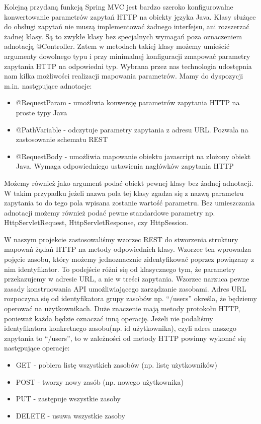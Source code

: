 Kolejną przydaną funkcją Spring MVC jest bardzo szeroko konfigurowalne konwertowanie parametrów zapytań HTTP na obiekty języka Java. Klasy służące do obsługi zapytań nie muszą implementować żadnego interfejsu, ani rozszerzać żadnej klasy. Są to zwykłe klasy bez specjalnych wymagań poza oznaczeniem adnotacją @Controller. Zatem w metodach takiej klasy możemy umieścić argumenty dowolnego typu i przy minimalnej konfiguracji zmapować parametry zapytania HTTP na odpowiedni typ. Wybrana przez nas technologia udostępnia nam kilka możliwości realizacji mapowania parametrów. Mamy do dyspozycji m.in. następujące adnotacje:

\begin{itemize}
\item @RequestParam - umożliwia konwersję parametrów zapytania HTTP na proste typy Java
\item @PathVariable - odczytuje parametry zapytania z adresu URL. Pozwala na zastosowanie schematu REST 
\item @RequestBody - umożliwia mapowanie obiektu javascript na złożony obiekt Java. Wymaga odpowiedniego ustawienia nagłówków zapytania HTTP
\end{itemize}

Możemy również jako argument podać obiekt pewnej klasy bez żadnej adnotacji. W takim przypadku jeżeli nazwa pola tej klasy zgadza się z nazwą parametru zapytania to do tego pola wpisana zostanie wartość parametru. Bez umieszczania adnotacji możemy również podać pewne standardowe parametry np. HttpServletRequest, HttpServletResponse, czy HttpSession.

W naszym projekcie zastosowaliśmy wzorzec REST do stworzenia struktury mapowań żądań HTTP na metody odpowiednich klasy. Wzorzec ten wprowadza pojęcie zasobu, który możemy jednoznacznie zidentyfikować poprzez powiązany z nim identyfikator. To podejście różni się od klasycznego tym, że parametry przekazujemy w adresie URL, a nie w treści zapytania. Wzorzec narzuca pewne zasady konstruowania API umożliwiającego zarządzanie zasobami. Adres URL rozpoczyna się od identyfikatora grupy zasobów np. “/users” określa, że będziemy operować na użytkownikach. Duże znaczenie mają metody protokołu HTTP, ponieważ każda będzie oznaczać inną operację. Jeżeli nie podaliśmy identyfikatora konkretnego zasobu(np. id użytkownika), czyli adres naszego zapytania to “/users”, to w zależności od metody HTTP powinny wykonać się następujące operacje:

\begin{itemize}
\item GET - pobiera listę wszystkich zasobów (np. listę użytkowników)
\item POST - tworzy nowy zasób (np. nowego użytkownika)
\item PUT - zastępuje wszystkie zasoby
\item DELETE - usuwa wszystkie zasoby
\end{itemize}

